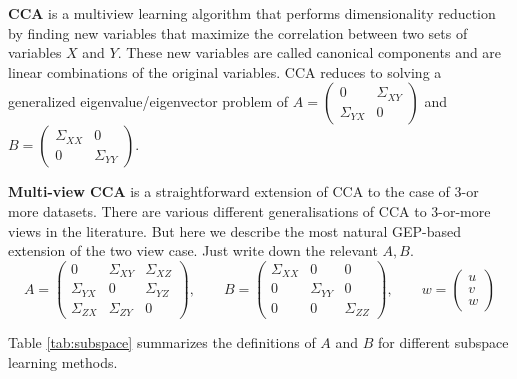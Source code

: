 \textbf{CCA} is a multiview learning algorithm that performs dimensionality reduction by finding new variables that maximize the correlation between two sets of variables $X$ and $Y$. These new variables are called canonical components and are linear combinations of the original variables. CCA reduces to solving a generalized eigenvalue/eigenvector problem of $A=\begin{pmatrix} 0 & \Sigma_{XY} \\ \Sigma_{YX} & 0\end{pmatrix}$ and $B=\begin{pmatrix} \Sigma_{XX} & 0 \\ 0 & \Sigma_{YY} \end{pmatrix}$.

\textbf{Multi-view CCA} is a straightforward extension of CCA to the case of 3-or more datasets. 
There are various different generalisations of CCA to 3-or-more views in the literature.
But here we describe the most natural GEP-based extension of the two view case. Just write down the relevant $A,B$.
\begin{equation}\label{eq:multi-view-cca-GEV}
	A = \begin{pmatrix} 0 &\Sigma_{XY} & \Sigma_{XZ} \\ \Sigma_{YX} & 0 & \Sigma_{YZ} \\ \Sigma_{ZX} & \Sigma_{ZY} & 0 \end{pmatrix}, \qquad
	B = \begin{pmatrix}\Sigma_{XX} & 0 & 0 \\ 0 & \Sigma_{YY} & 0 \\ 0 & 0 & \Sigma_{ZZ} \end{pmatrix}, \qquad
	w =\begin{pmatrix}	u \\ v \\ w \end{pmatrix}
\end{equation}

Table \ref{tab:subspace} summarizes the definitions of $A$ and $B$ for different subspace learning methods.


